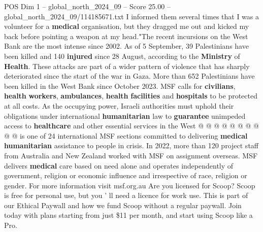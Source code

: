 \begin{textsample}{POS Dim 1 – global\_north\_2024\_09 – Score 25.00 – global\_north\_2024\_09/114185671.txt}
I informed them several times that I was a volunteer for a \textbf{medical} organisation, but they dragged me out and kicked my back before pointing a weapon at my head."The recent incursions on the West Bank are the most intense since 2002.
As of 5 September, 39 Palestinians have been killed and 140 \textbf{injured} since 28 August, according to the \textbf{Ministry} of \textbf{Health}.
These attacks are part of a wider pattern of violence that has sharply deteriorated since the start of the war in Gaza.
More than 652 Palestinians have been killed in the West Bank since October 2023.
MSF calls for \textbf{civilians}, \textbf{health} \textbf{workers}, \textbf{ambulances}, \textbf{health} \textbf{facilities} and \textbf{hospitals} to be protected at all costs.
As the occupying power, Israeli authorities must uphold their obligations under international \textbf{humanitarian} law to \textbf{guarantee} unimpeded access to \textbf{healthcare} and other essential services in the West @ @ @ @ @ @ @ @ @ @ is one of 24 international MSF sections committed to delivering \textbf{medical} \textbf{humanitarian} assistance to people in crisis.
In 2022, more than 120 project staff from Australia and New Zealand worked with MSF on assignment overseas.
MSF delivers \textbf{medical} care based on need alone and operates independently of government, religion or economic influence and irrespective of race, religion or gender.
For more information visit msf.org.au Are you licensed for Scoop?
Scoop is free for personal use, but you ' ll need a licence for work use.
This is part of our Ethical Paywall and how we fund Scoop without a regular paywall.
Join today with plans starting from just \$11 per month, and start using Scoop like a Pro.

\end{textsample}
